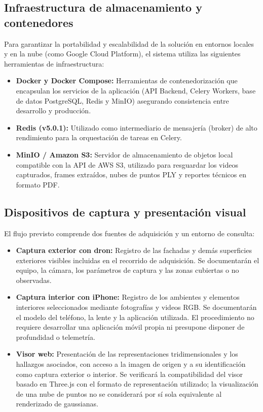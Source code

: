 \documentclass[12pt,oneside]{report}
\begin{document}
\subsection{Infraestructura de almacenamiento y contenedores}
Para garantizar la portabilidad y escalabilidad de la solución en entornos locales y en la nube (como Google Cloud Platform), el sistema utiliza las siguientes herramientas de infraestructura:
\begin{itemize}
    \item \textbf{Docker y Docker Compose:} Herramientas de contenedorización que encapsulan los servicios de la aplicación (API Backend, Celery Workers, base de datos PostgreSQL, Redis y MinIO) asegurando consistencia entre desarrollo y producción.
    \item \textbf{Redis (v5.0.1):} Utilizado como intermediario de mensajería (broker) de alto rendimiento para la orquestación de tareas en Celery.
    \item \textbf{MinIO / Amazon S3:} Servidor de almacenamiento de objetos local compatible con la API de AWS S3, utilizado para resguardar los videos capturados, frames extraídos, nubes de puntos PLY y reportes técnicos en formato PDF.
\end{itemize}

\subsection{Dispositivos de captura y presentación visual}
El flujo previsto comprende dos fuentes de adquisición y un entorno de consulta:
\begin{itemize}
    \item \textbf{Captura exterior con dron:} Registro de las fachadas y demás superficies exteriores visibles incluidas en el recorrido de adquisición. Se documentarán el equipo, la cámara, los parámetros de captura y las zonas cubiertas o no observadas.
    \item \textbf{Captura interior con iPhone:} Registro de los ambientes y elementos interiores seleccionados mediante fotografías y videos RGB. Se documentarán el modelo del teléfono, la lente y la aplicación utilizada. El procedimiento no requiere desarrollar una aplicación móvil propia ni presupone disponer de profundidad o telemetría.
    \item \textbf{Visor web:} Presentación de las representaciones tridimensionales y los hallazgos asociados, con acceso a la imagen de origen y a su identificación como captura exterior o interior. Se verificará la compatibilidad del visor basado en Three.js con el formato de representación utilizado; la visualización de una nube de puntos no se considerará por sí sola equivalente al renderizado de gaussianas.
\end{itemize}
\end{document}
